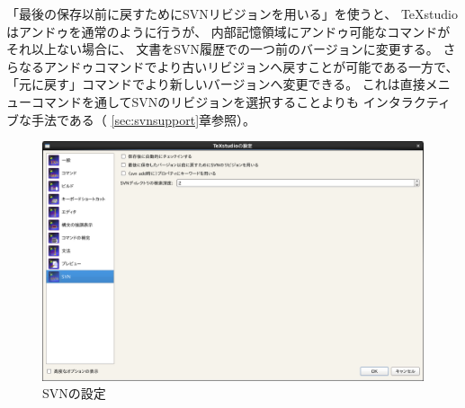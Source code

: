 「最後の保存以前に戻すためにSVNリビジョンを用いる」を使うと、
TeXstudioはアンドゥを通常のように行うが、
内部記憶領域にアンドゥ可能なコマンドがそれ以上ない場合に、
文書をSVN履歴での一つ前のバージョンに変更する。
さらなるアンドゥコマンドでより古いリビジョンへ戻すことが可能である一方で、
「元に戻す」コマンドでより新しいバージョンへ変更できる。
これは直接メニューコマンドを通してSVNのリビジョンを選択することよりも
インタラクティブな手法である（
\ref{sec:svnsupport}章参照）。

\begin{figure}[H]
  \centering
  \includegraphics[width=.8\linewidth]{configure_svn.png}
  \caption{SVNの設定}
\end{figure}

